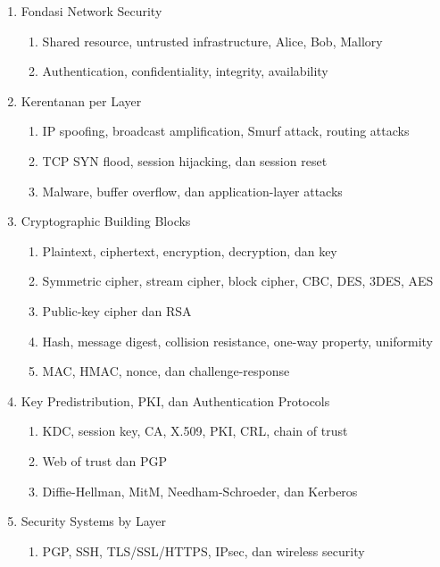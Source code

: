 \begin{enumerate}
    \item \pwajib Fondasi Network Security
    \begin{enumerate}
        \item \pwajib Shared resource, untrusted infrastructure, Alice, Bob, Mallory
        \item \pwajib Authentication, confidentiality, integrity, availability
    \end{enumerate}
    \item \pwajib Kerentanan per Layer
    \begin{enumerate}
        \item \pwajib IP spoofing, broadcast amplification, Smurf attack, routing attacks
        \item \pwajib TCP SYN flood, session hijacking, dan session reset
        \item \pwajib Malware, buffer overflow, dan application-layer attacks
    \end{enumerate}
    \item \pwajib Cryptographic Building Blocks
    \begin{enumerate}
        \item \pwajib Plaintext, ciphertext, encryption, decryption, dan key
        \item \pwajib Symmetric cipher, stream cipher, block cipher, CBC, DES, 3DES, AES
        \item \pwajib Public-key cipher dan RSA
        \item \pwajib Hash, message digest, collision resistance, one-way property, uniformity
        \item \pwajib MAC, HMAC, nonce, dan challenge-response
    \end{enumerate}
    \item \pwajib Key Predistribution, PKI, dan Authentication Protocols
    \begin{enumerate}
        \item \pwajib KDC, session key, CA, X.509, PKI, CRL, chain of trust
        \item \ppaham Web of trust dan PGP
        \item \pwajib Diffie-Hellman, MitM, Needham-Schroeder, dan Kerberos
    \end{enumerate}
    \item \pwajib Security Systems by Layer
    \begin{enumerate}
        \item \pwajib PGP, SSH, TLS/SSL/HTTPS, IPsec, dan wireless security

\end{enumerate}
\end{enumerate}

